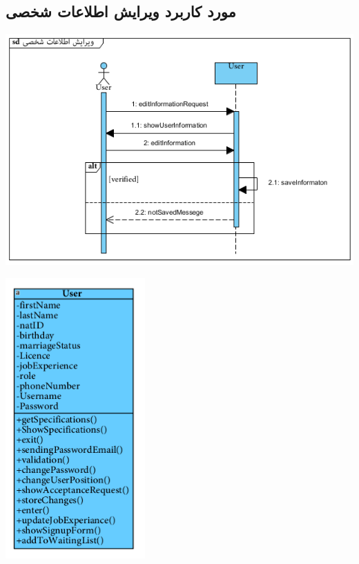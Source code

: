\newpage
\vspace{2cm}
\subsection*{مورد کاربرد ویرایش اطلاعات شخصی}
\vspace{2cm}
\begin{center}
\includegraphics[width=\textwidth]{SequenceDiagrams/11.png}
\end{center}

\newpage
\vspace{2cm}
\begin{center}
\includegraphics[width=0.4\textwidth]{SequenceClasses/11.png}
\end{center}

